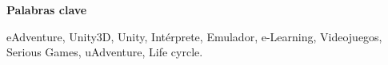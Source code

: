 \vspace{1cm}


\begin{center}

{\bf \Large Palabras clave}

   \end{center}

   \vspace{0.5cm}
   
eAdventure, Unity3D, Unity, Intérprete, Emulador, e-Learning, Videojuegos, Serious Games, uAdventure, Life cyrcle.
   


